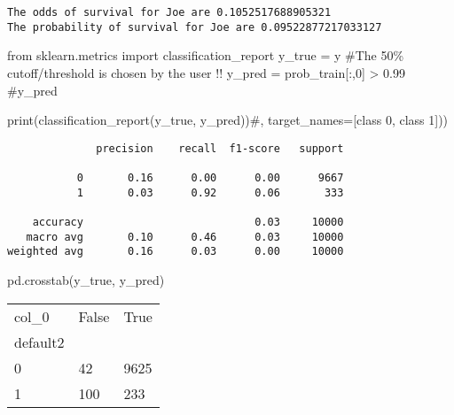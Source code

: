 \documentclass[
  letterpaper,
  DIV=11,
  numbers=noendperiod]{scrreprt}
\newenvironment{Shaded}{\begin{snugshade}}{\end{snugshade}}
\newcommand{\BuiltInTok}[1]{\textcolor[rgb]{0.00,0.23,0.31}{#1}}
\newcommand{\CommentTok}[1]{\textcolor[rgb]{0.37,0.37,0.37}{#1}}
\newcommand{\DecValTok}[1]{\textcolor[rgb]{0.68,0.00,0.00}{#1}}
\newcommand{\FloatTok}[1]{\textcolor[rgb]{0.68,0.00,0.00}{#1}}
\newcommand{\ImportTok}[1]{\textcolor[rgb]{0.00,0.46,0.62}{#1}}
\newcommand{\NormalTok}[1]{\textcolor[rgb]{0.00,0.23,0.31}{#1}}
\newcommand{\OperatorTok}[1]{\textcolor[rgb]{0.37,0.37,0.37}{#1}}
\begin{document}
\begin{verbatim}
The odds of survival for Joe are 0.1052517688905321
The probability of survival for Joe are 0.09522877217033127
\end{verbatim}

\begin{Shaded}
\begin{Highlighting}[]
\ImportTok{from}\NormalTok{ sklearn.metrics }\ImportTok{import}\NormalTok{ classification\_report}
\NormalTok{y\_true }\OperatorTok{=}\NormalTok{ y}
\CommentTok{\#The 50\% cutoff/threshold is chosen by the user !!}
\NormalTok{y\_pred }\OperatorTok{=}\NormalTok{ prob\_train[:,}\DecValTok{0}\NormalTok{] }\OperatorTok{\textgreater{}} \FloatTok{0.99}
\CommentTok{\#y\_pred}

\BuiltInTok{print}\NormalTok{(classification\_report(y\_true, y\_pred))}\CommentTok{\#, target\_names=[\textquotesingle{}class 0\textquotesingle{}, \textquotesingle{}class 1\textquotesingle{}]))}
\end{Highlighting}
\end{Shaded}

\begin{verbatim}
              precision    recall  f1-score   support

           0       0.16      0.00      0.00      9667
           1       0.03      0.92      0.06       333

    accuracy                           0.03     10000
   macro avg       0.10      0.46      0.03     10000
weighted avg       0.16      0.03      0.00     10000
\end{verbatim}

\begin{Shaded}
\begin{Highlighting}[]
\NormalTok{pd.crosstab(y\_true, y\_pred)}
\end{Highlighting}
\end{Shaded}

\begin{longtable}[]{@{}lll@{}}
\toprule()
col\_0 & False & True \\
default2 & & \\
\midrule()
\endhead
0 & 42 & 9625 \\
1 & 100 & 233 \\
\bottomrule()
\end{longtable}
\end{document}
